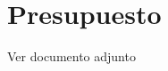 \documentclass[11pt]{article}
\begin{document}



































\section{ Presupuesto}

Ver documento adjunto


\end{document}
